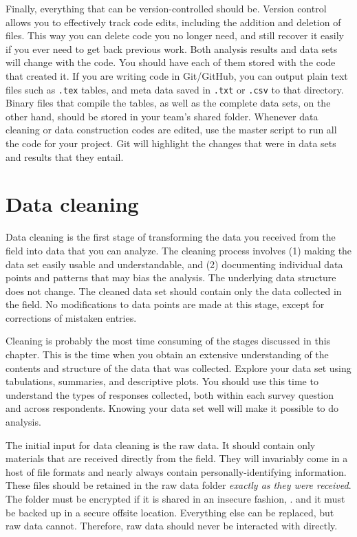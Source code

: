 Finally, everything that can be version-controlled should be. 
Version control allows you to effectively track code edits,
including the addition and deletion of files. 
This way you can delete code you no longer need, 
and still recover it easily if you ever need to get back previous work.
Both analysis results and data sets will change with the code.
You should have each of them stored with the code that created it.
If you are writing code in Git/GitHub,
you can output plain text files such as \texttt{.tex} tables,
and meta data saved in \texttt{.txt} or \texttt{.csv} to that directory.
Binary files that compile the tables,
as well as the complete data sets, on the other hand,
should be stored in your team's shared folder. 
Whenever data cleaning or data construction codes are edited,
use the master script to run all the code for your project.
Git will highlight the changes that were in data sets and results that they entail. 


\section{Data cleaning}

Data cleaning is the first stage of transforming the data you received from the field into data that you can analyze.
The cleaning process involves (1) making the data set easily usable and understandable, and (2) documenting individual data points and patterns that may bias the analysis.
The underlying data structure does not change.
The cleaned data set should contain only the data collected in the field.
No modifications to data points are made at this stage, except for corrections of mistaken entries.

Cleaning is probably the most time consuming of the stages discussed in this chapter.
This is the time when you obtain an extensive understanding of  the contents and structure of the data that was collected.
Explore your data set using tabulations, summaries, and descriptive plots.
You should use this time to understand the types of responses collected, both within each survey question and across respondents.
Knowing your data set well will make it possible to do analysis.


The initial input for data cleaning is the raw data.
It should contain only materials that are received directly from the field.
They will invariably come in a host of file formats and nearly always contain personally-identifying information.
These files should be retained in the raw data folder \textit{exactly as they were received}.
The folder must be encrypted if it is shared in an insecure fashion,
.
and it must be backed up in a secure offsite location.
Everything else can be replaced, but raw data cannot.
Therefore, raw data should never be interacted with directly.

